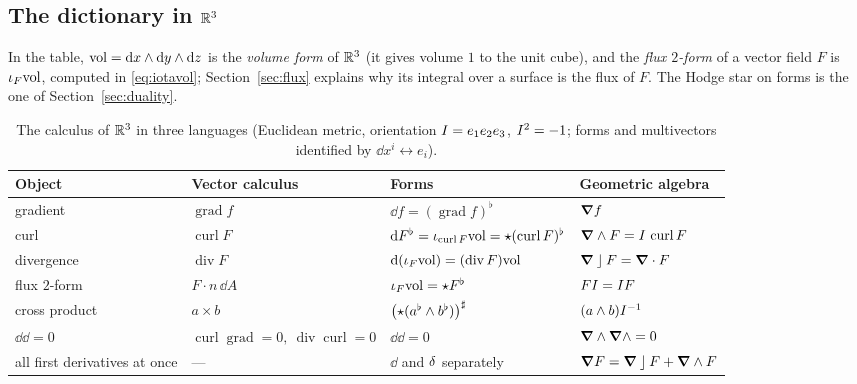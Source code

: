 \subsection{The dictionary in $\mathbb{R}^3$}

In the table, $\mathrm{vol}=\mathrm{d} x\wedge\mathrm{d} y\wedge\mathrm{d} z$ is the \emph{volume form} of $\mathbb{R}^3$ (it gives volume $1$ to the unit cube), and the
\emph{flux $2$-form} of a vector field $F$ is $\iota_F\mathrm{vol}$, computed in \eqref{eq:iotavol}; Section~\ref{sec:flux} explains why its
integral over a surface is the flux of $F$. The Hodge star on forms is the one of Section~\ref{sec:duality}.

\begin{table}[ht]
\centering
\small
\renewcommand{\arraystretch}{1.4}
\begin{tabular}{@{}p{3.0cm}p{3.4cm}p{4.2cm}p{4.0cm}@{}}
\toprule
\textbf{Object} & \textbf{Vector calculus} & \textbf{Forms} & \textbf{Geometric algebra}\\
\midrule
gradient & $\operatorname{grad}f$ & $\dd f=(\operatorname{grad}f)^\flat$ & $\boldsymbol{\nabla} f$\\
curl & $\operatorname{curl}F$ & $\mathrm{d} F^\flat=\iota_{\operatorname{curl}F}\mathrm{vol}=\star(\operatorname{curl}F)^\flat$ & $\boldsymbol{\nabla}\wedge F=I\,\operatorname{curl}F$\\
divergence & $\operatorname{div}F$ & $\mathrm{d}(\iota_F\mathrm{vol})=(\operatorname{div}F)\mathrm{vol}$ & $\boldsymbol{\nabla}\mathbin{\rfloor} F=\boldsymbol{\nabla}\cdot F$\\
flux $2$-form & $F\cdot n\,\dd A$ & $\iota_F\mathrm{vol}=\star F^\flat$ & $FI=I F$\\
cross product & $a\times b$ & $\bigl(\star(a^\flat\wedge b^\flat)\bigr)^\sharp$ & $(a\wedge b)I^{-1}$\\
$\dd\dd=0$ & $\operatorname{curl}\operatorname{grad}=0,\ \operatorname{div}\operatorname{curl}=0$ & $\dd\dd=0$ & $\boldsymbol{\nabla}\wedge\boldsymbol{\nabla}\wedge=0$\\
all first derivatives at once & --- & $\dd$ and $\delta$ separately & $\boldsymbol{\nabla} F=\boldsymbol{\nabla}\mathbin{\rfloor} F+\boldsymbol{\nabla}\wedge F$\\
\bottomrule
\end{tabular}
\caption{The calculus of $\mathbb{R}^3$ in three languages (Euclidean metric, orientation $I=e_1e_2e_3$, $I^2=-1$; forms and multivectors identified by $\dd x^i\leftrightarrow e_i$).}
\label{tab:dictionary3}
\end{table}

